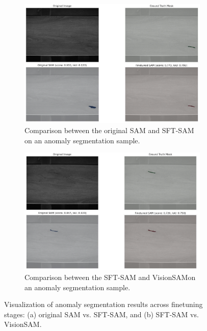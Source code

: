 \documentclass[11pt]{article}
\newcommand{\model}{VisionSAM}
\begin{document}
\begin{figure}[htbp]
  \centering
  \begin{subfigure}[t]{0.49\textwidth}
    \includegraphics[width=\linewidth]{figs/wood_034.png}
    \caption{Comparison between the original SAM and SFT-SAM on an anomaly segmentation sample.}
  \end{subfigure}
  \hfill
  \begin{subfigure}[t]{0.49\textwidth}
    \includegraphics[width=\linewidth]{figs/wood_026_noise.png}
    \caption{Comparison between the SFT-SAM and \model on an anomaly segmentation sample.}
  \end{subfigure}
  \caption{Visualization of anomaly segmentation results across finetuning stages: (a) original SAM vs. SFT-SAM, and (b) SFT-SAM vs. \model.}
  \label{fig:sft_vs_rlhf}
\end{figure}
\end{document}
